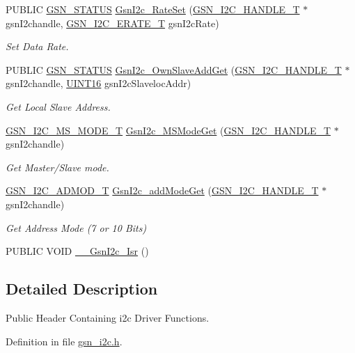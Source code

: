 \begin{DoxyCompactItemize}
PUBLIC \hyperlink{a00660_gada5951904ac6110b1fa95e51a9ddc217}{GSN\_\-STATUS} \hyperlink{a00649_ga087be6496fcf8dc85fab781f736c0a24}{GsnI2c\_\-RateSet} (\hyperlink{a00100}{GSN\_\-I2C\_\-HANDLE\_\-T} $\ast$gsnI2chandle, \hyperlink{a00649_gad834947ae5685696ffea0ecec904b16e}{GSN\_\-I2C\_\-ERATE\_\-T} gsnI2cRate)
\begin{DoxyCompactList}\small\item\em Set Data Rate. \end{DoxyCompactList}\item 
PUBLIC \hyperlink{a00660_gada5951904ac6110b1fa95e51a9ddc217}{GSN\_\-STATUS} \hyperlink{a00649_ga2a1f35ecff4dd0518db43da269962818}{GsnI2c\_\-OwnSlaveAddGet} (\hyperlink{a00100}{GSN\_\-I2C\_\-HANDLE\_\-T} $\ast$gsnI2chandle, \hyperlink{a00660_ga09f1a1fb2293e33483cc8d44aefb1eb1}{UINT16} gsnI2cSlavelocAddr)
\begin{DoxyCompactList}\small\item\em Get Local Slave Address. \end{DoxyCompactList}\item 
\hyperlink{a00649_ga72605883ea904f4ee6c310a25142a0ab}{GSN\_\-I2C\_\-MS\_\-MODE\_\-T} \hyperlink{a00649_gabcb5149cfa26cd66ce55cfad5c8d9a56}{GsnI2c\_\-MSModeGet} (\hyperlink{a00100}{GSN\_\-I2C\_\-HANDLE\_\-T} $\ast$gsnI2chandle)
\begin{DoxyCompactList}\small\item\em Get Master/Slave mode. \end{DoxyCompactList}\item 
\hyperlink{a00649_gac3021fdaf2e11a7972d53d5292ad5f26}{GSN\_\-I2C\_\-ADMOD\_\-T} \hyperlink{a00649_gaee7528d38130deb5c253f3b1efc46fba}{GsnI2c\_\-addModeGet} (\hyperlink{a00100}{GSN\_\-I2C\_\-HANDLE\_\-T} $\ast$gsnI2chandle)
\begin{DoxyCompactList}\small\item\em Get Address Mode (7 or 10 Bits) \end{DoxyCompactList}\item 
PUBLIC VOID \hyperlink{a00516_a435a32856858c9f711f5292120e0f4c8}{\_\-\_\-GsnI2c\_\-Isr} ()
\end{DoxyCompactItemize}


\subsection{Detailed Description}
Public Header Containing i2c Driver Functions. 

Definition in file \hyperlink{a00516_source}{gsn\_\-i2c.h}.




